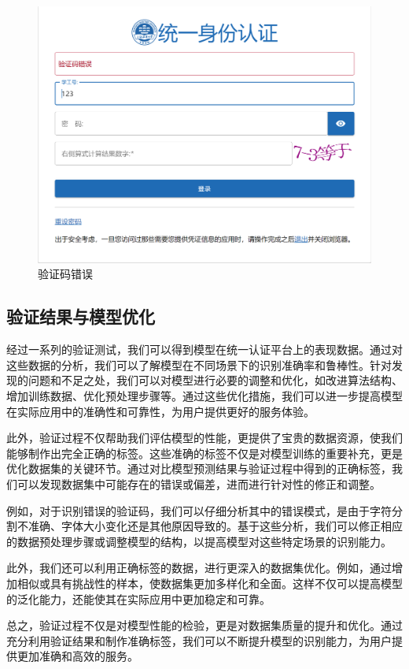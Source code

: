 \begin{figure}
	\centering
	\includegraphics[width=0.9\linewidth]{Resources/Picture/CAS/code_error}
	\caption{验证码错误}
	\label{fig:codeerror}
\end{figure}

\subsection{验证结果与模型优化}

经过一系列的验证测试，我们可以得到模型在统一认证平台上的表现数据。通过对这些数据的分析，我们可以了解模型在不同场景下的识别准确率和鲁棒性。针对发现的问题和不足之处，我们可以对模型进行必要的调整和优化，如改进算法结构、增加训练数据、优化预处理步骤等。通过这些优化措施，我们可以进一步提高模型在实际应用中的准确性和可靠性，为用户提供更好的服务体验。

此外，验证过程不仅帮助我们评估模型的性能，更提供了宝贵的数据资源，使我们能够制作出完全正确的标签。这些准确的标签不仅是对模型训练的重要补充，更是优化数据集的关键环节。通过对比模型预测结果与验证过程中得到的正确标签，我们可以发现数据集中可能存在的错误或偏差，进而进行针对性的修正和调整。

例如，对于识别错误的验证码，我们可以仔细分析其中的错误模式，是由于字符分割不准确、字体大小变化还是其他原因导致的。基于这些分析，我们可以修正相应的数据预处理步骤或调整模型的结构，以提高模型对这些特定场景的识别能力。

此外，我们还可以利用正确标签的数据，进行更深入的数据集优化。例如，通过增加相似或具有挑战性的样本，使数据集更加多样化和全面。这样不仅可以提高模型的泛化能力，还能使其在实际应用中更加稳定和可靠。

总之，验证过程不仅是对模型性能的检验，更是对数据集质量的提升和优化。通过充分利用验证结果和制作准确标签，我们可以不断提升模型的识别能力，为用户提供更加准确和高效的服务。
